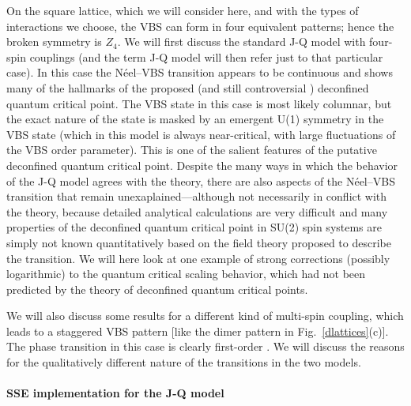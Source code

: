 \documentclass[draft,numberedheadings]{aipproc}
\begin{document}
On the square lattice, which we will consider here, and with the types of interactions we choose, the VBS can form in four equivalent patterns; 
hence the broken symmetry is $Z_4$. We will first discuss the standard J-Q model with four-spin couplings \cite{sandvik1} (and the term J-Q model 
will then refer just to that particular case). In this case the N\'eel--VBS transition appears to be continuous and shows many of the hallmarks 
of the proposed \cite{senthil1,senthil2} (and still controversial \cite{kuklov08}) deconfined quantum critical point. The VBS state in this 
case is most likely columnar, but the exact nature of the state is masked by an emergent U(1) symmetry in the VBS state (which in this model is 
always near-critical, with large fluctuations of the VBS order parameter). This is one of the salient features of the putative deconfined quantum 
critical point. Despite the many ways in which the behavior of the J-Q model agrees with the theory, there are also aspects of the N\'eel--VBS 
transition that remain unexaplained---although not necessarily in conflict with the theory, because detailed analytical calculations are very 
difficult \cite{senthil2,nogueira07} and many properties of the deconfined quantum critical point in SU(2) spin systems are simply not known
quantitatively based on the field theory proposed to describe the transition. We will here look at one example of strong corrections (possibly 
logarithmic) to the quantum critical scaling behavior, which had not been predicted by the theory of deconfined quantum critical points.

We will also discuss some results for a different kind of multi-spin coupling, which leads to a staggered VBS pattern [like the dimer pattern 
in Fig.~\ref{dlattices}(c)]. The phase transition in this case is clearly first-order \cite{arnab}. We will discuss the reasons for the qualitatively 
different nature of the transitions in the two models. 

\paragraph{SSE implementation for the J-Q model}
\end{document}

